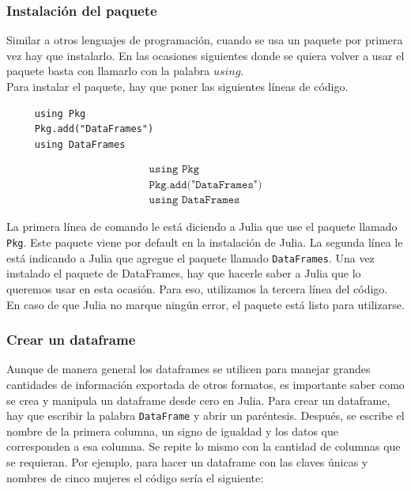 \subsubsection{Instalación del paquete}
Similar a otros lenguajes de programación, cuando se usa un paquete por primera vez hay que instalarlo. En las ocasiones siguientes donde se quiera volver a usar el paquete basta con llamarlo con la palabra $using$. 
\\
Para instalar el paquete, hay que poner las siguientes líneas de código. 

\begin{verbatim} 
     using Pkg
     Pkg.add("DataFrames")
     using DataFrames
\end{verbatim}


\begin{tcolorbox}
\begin{equation}
\begin{aligned} \label{instalacion_paquete}
       \texttt{using Pkg} \\
        \texttt{Pkg.add("DataFrames")} \\
        \texttt{using DataFrames}
\end{aligned}
\end{equation}
\end{tcolorbox}


La primera línea de comando le está diciendo a Julia que use el paquete llamado \texttt{Pkg}. Este paquete viene por default en la instalación de Julia. La segunda línea le está indicando a Julia que agregue el paquete llamado \texttt{DataFrames}. 
Una vez instalado el paquete de DataFrames, hay que hacerle saber a Julia que lo queremos usar en esta ocasión. Para eso, utilizamos la tercera línea del código. En caso de que Julia no marque ningún error, el paquete está listo para utilizarse. 

\subsubsection{Crear un dataframe}

Aunque de manera general los dataframes se utilicen para manejar grandes cantidades de información exportada de otros formatos, es importante saber como se crea y manipula un dataframe desde cero en Julia. Para crear un dataframe, hay que escribir la palabra \texttt{DataFrame} y abrir un paréntesis. Después, se escribe el nombre de la primera columna, un signo de igualdad y los datos que corresponden a esa columna. Se repite lo mismo con la cantidad de columnas que se requieran. Por ejemplo, para hacer un dataframe con las claves únicas y nombres de cinco mujeres el código sería el siguiente: 


